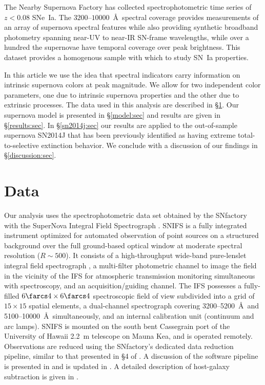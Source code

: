 \documentclass{aastex}   	%
\begin{document}
The Nearby Supernova Factory \citep[SNfactory;][]{2004SPIE.5249..146L} has collected  
spectrophotometric time series of $z<0.08$ SNe~Ia.   The $3200$--$10000$~\AA\ spectral coverage
provides measurements of an array of supernova spectral features while also providing synthetic broadband photometry
spanning near-UV to near-IR SN-frame wavelengths, while over a hundred the supernovae have temporal coverage over
peak brightness.  This dataset provides a homogenous sample with which to study SN~Ia properties.

In this article we use the idea that spectral indicators carry information on intrinsic supernova colors at peak magnitude.
We allow for two independent color parameters, one due to intrinsic supernova
properties and the other due to
extrinsic processes.  The data used in this analysis are described in \S\ref{data:sec}.  Our supernova model is presented in
\S\ref{model:sec} and results are given in \S\ref{results:sec}.  In \S\ref{sn2014j:sec} our results are applied to the out-of-sample
supernova SN2014J that has been previously identified as having extreme total-to-selective extinction behavior.
We conclude with a discussion of our findings in \S\ref{discussion:sec}.


\section{Data}
\label{data:sec}

Our analysis uses the spectrophotometric data set obtained by
the SNfactory with the SuperNova Integral Field
Spectrograph \citep[SNIFS,][]{2004SPIE.5249..146L}.  SNIFS is a fully integrated
instrument optimized for automated observation of point sources on a
structured background over the full ground-based optical window at
moderate spectral resolution ($R \sim 500$).  It consists of a
high-throughput wide-band pure-lenslet integral field spectrograph
\citep[IFS, ``\`a la TIGER;''][]{1995A&AS..113..347B,2000ASPC..195..173B,2001MNRAS.326...23B}, a
multi-filter photometric channel to image the field in the vicinity of
the IFS for atmospheric transmission monitoring simultaneous with
spectroscopy, and an acquisition/guiding channel.  The IFS possesses a
fully-filled $6\farcs 4 \times 6\farcs 4$ spectroscopic field of view
subdivided into a grid of $15 \times 15$ spatial elements, a
dual-channel spectrograph covering 3200--5200~\AA\ and 5100--10000~\AA\
simultaneously, and an internal calibration unit (continuum and arc
lamps).  SNIFS is mounted on the south bent Cassegrain port of the
University of Hawaii 2.2~m telescope on Mauna Kea, and is operated
remotely.  Observations are reduced using the SNfactory's dedicated data
reduction pipeline, similar to that presented in \S4 of \citet{2001MNRAS.326...23B}.
A discussion of the software pipeline is presented in
\citet{2006ApJ...650..510A} and is updated in \citet{2010ApJ...713.1073S}.  A detailed
description of host-galaxy subtraction is given in \citet{2011MNRAS.418..258B}.
\end{document}
